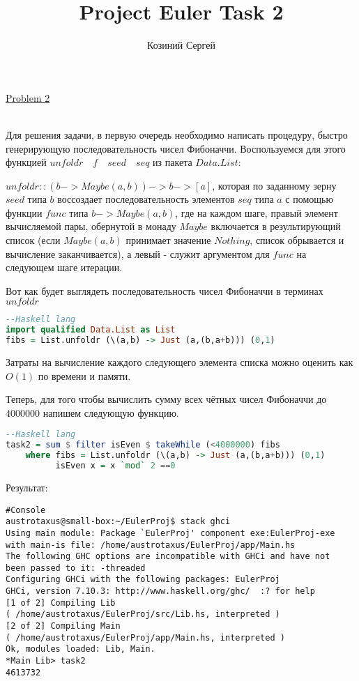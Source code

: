 \documentclass[11pt,a4paper]{article}
\title{Project Euler Task 2}
\author{Козиний Сергей}
\begin{document}
    
\maketitle
\href{''https://projecteuler.net/problem=2''}{Problem 2}

\\

Для решения задачи, в первую очередь необходимо написать процедуру, быстро генерирующую последовательность чисел Фибоначчи. Воспользуемся для этого функцией $unfoldr \quad f \quad seed \quad seq$ из пакета $Data.List$:

$unfoldr :: (b -> Maybe (a, b)) -> b -> [a] $,
которая по заданному зерну $seed$ типа $b$ воссоздает последовательность элементов $seq$ типа $a$ с помощью функции $func$ типа  $b -> Maybe (a, b)$, где на каждом шаге, правый элемент вычисляемой пары, обернутой в монаду $Maybe$ включается в результирующий список (если $Maybe(a,b)$ принимает значение $Nothing$, список обрывается и вычисление заканчивается), а левый - служит аргументом для $func$ на следующем шаге итерации. 

Вот как будет выглядеть последовательность чисел Фибоначчи в терминах $unfoldr$

\begin{lstlisting}[language=Haskell, frame=single]
  --Haskell lang
import qualified Data.List as List
fibs = List.unfoldr (\(a,b) -> Just (a,(b,a+b))) (0,1)  
\end{lstlisting}
Затраты на вычисление каждого следующего элемента списка можно оценить как  $O(1)$ по времени и памяти.

Теперь, для того чтобы вычислить сумму всех чётных чисел Фибоначчи до 4000000 напишем следующую функцию.
\begin{lstlisting}[language=Haskell, frame=single]
  --Haskell lang
task2 = sum $ filter isEven $ takeWhile (<4000000) fibs 
    where fibs = List.unfoldr (\(a,b) -> Just (a,(b,a+b))) (0,1)
          isEven x = x `mod` 2 ==0
\end{lstlisting}

Результат:

\begin{lstlisting}[frame=single]
#Console
austrotaxus@small-box:~/EulerProj$ stack ghci
Using main module: Package `EulerProj' component exe:EulerProj-exe
with main-is file: /home/austrotaxus/EulerProj/app/Main.hs
The following GHC options are incompatible with GHCi and have not
been passed to it: -threaded
Configuring GHCi with the following packages: EulerProj
GHCi, version 7.10.3: http://www.haskell.org/ghc/  :? for help
[1 of 2] Compiling Lib
( /home/austrotaxus/EulerProj/src/Lib.hs, interpreted )
[2 of 2] Compiling Main
( /home/austrotaxus/EulerProj/app/Main.hs, interpreted )
Ok, modules loaded: Lib, Main. 
*Main Lib> task2
4613732
\end{lstlisting}
\end{document}
